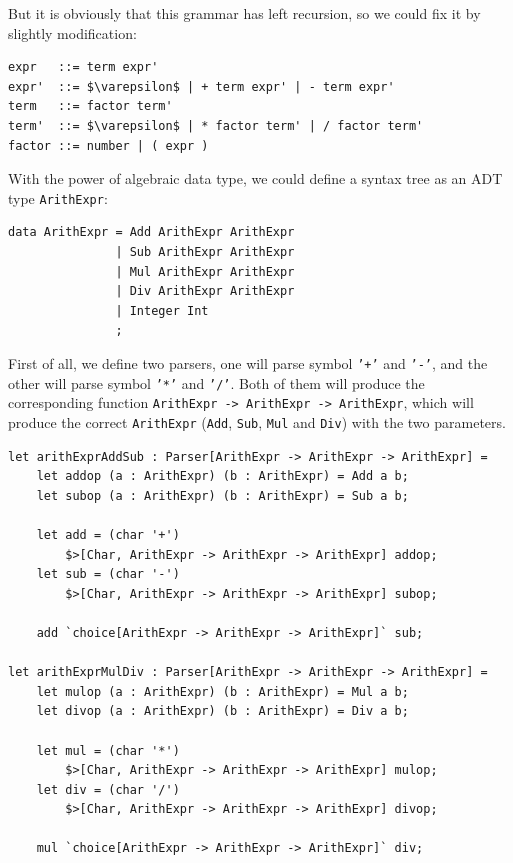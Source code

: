 But it is obviously that this grammar has left recursion, so we could fix it by slightly modification:

\begin{lstlisting}[language={},mathescape]
expr   ::= term expr'
expr'  ::= $\varepsilon$ | + term expr' | - term expr'
term   ::= factor term'
term'  ::= $\varepsilon$ | * factor term' | / factor term'
factor ::= number | ( expr )
\end{lstlisting}

With the power of algebraic data type, we could define a syntax tree as an ADT type \texttt{ArithExpr}:

\begin{lstlisting}
data ArithExpr = Add ArithExpr ArithExpr
               | Sub ArithExpr ArithExpr
               | Mul ArithExpr ArithExpr
               | Div ArithExpr ArithExpr
               | Integer Int
               ;
\end{lstlisting}

First of all, we define two parsers, one will parse symbol \texttt{'+'} and \texttt{'-'}, and the other will parse symbol \texttt{'*'} and \texttt{'/'}. Both of them will produce the corresponding function \texttt{ArithExpr -> ArithExpr -> ArithExpr}, which will produce the correct \texttt{ArithExpr} (\texttt{Add}, \texttt{Sub}, \texttt{Mul} and \texttt{Div}) with the two parameters.

\begin{lstlisting}
let arithExprAddSub : Parser[ArithExpr -> ArithExpr -> ArithExpr] =
    let addop (a : ArithExpr) (b : ArithExpr) = Add a b;
    let subop (a : ArithExpr) (b : ArithExpr) = Sub a b;

    let add = (char '+')
        $>[Char, ArithExpr -> ArithExpr -> ArithExpr] addop;
    let sub = (char '-')
        $>[Char, ArithExpr -> ArithExpr -> ArithExpr] subop;

    add `choice[ArithExpr -> ArithExpr -> ArithExpr]` sub;

let arithExprMulDiv : Parser[ArithExpr -> ArithExpr -> ArithExpr] =
    let mulop (a : ArithExpr) (b : ArithExpr) = Mul a b;
    let divop (a : ArithExpr) (b : ArithExpr) = Div a b;

    let mul = (char '*')
        $>[Char, ArithExpr -> ArithExpr -> ArithExpr] mulop;
    let div = (char '/')
        $>[Char, ArithExpr -> ArithExpr -> ArithExpr] divop;

    mul `choice[ArithExpr -> ArithExpr -> ArithExpr]` div;
\end{lstlisting}

